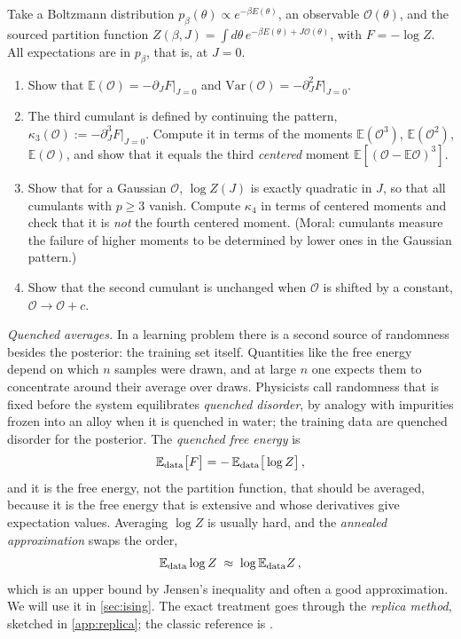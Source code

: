 \documentclass[11pt]{article}
\newcommand{\E}{\mathbb{E}}
\newcommand{\CO}{{\mathcal O}}
\newcommand{\pd}{\partial}
\begin{document}
\begin{exercise}
\label{ex:cumulants}
\important
Take a Boltzmann distribution $p_\beta(\theta)\propto e^{-\beta E(\theta)}$, an observable $\CO(\theta)$, and the sourced partition function $Z(\beta,J) = \int d\theta\, e^{-\beta E(\theta)+J\CO(\theta)}$, with $F = -\log Z$. All expectations are in $p_\beta$, that is, at $J=0$.
\begin{enumerate}
  \item Show that $\E(\CO) = -\pd_JF|_{J=0}$ and $\mathrm{Var}(\CO) = -\pd_J^2F|_{J=0}$.
  \item The third cumulant is defined by continuing the pattern, $\kappa_3(\CO) := -\pd_J^3F|_{J=0}$. Compute it in terms of the moments $\E(\CO^3)$, $\E(\CO^2)$, $\E(\CO)$, and show that it equals the third \emph{centered} moment $\E[(\CO-\E\CO)^3]$.
  \item Show that for a Gaussian $\CO$, $\log Z(J)$ is exactly quadratic in $J$, so that all cumulants with $p\geq 3$ vanish. Compute $\kappa_4$ in terms of centered moments and check that it is \emph{not} the fourth centered moment. (Moral: cumulants measure the failure of higher moments to be determined by lower ones in the Gaussian pattern.)
  \item Show that the second cumulant is unchanged when $\CO$ is shifted by a constant, $\CO \to \CO + c$.
\end{enumerate}
\end{exercise}

\emph{Quenched averages.} In a learning problem there is a second source of randomness besides the posterior: the training set itself. Quantities like the free energy depend on which $n$ samples were drawn, and at large $n$ one expects them to concentrate around their average over draws. Physicists call randomness that is fixed before the system equilibrates \emph{quenched disorder}, by analogy with impurities frozen into an alloy when it is quenched in water; the training data are quenched disorder for the posterior. The \emph{quenched free energy} is
%
\begin{equation}
    \E_{\rm data}\big[F\big] = -\,\E_{\rm data}\big[\log Z\big]\,, \label{quenched-F}
\end{equation}
%
and it is the free energy, not the partition function, that should be averaged, because it is the free energy that is extensive and whose derivatives give expectation values. Averaging $\log Z$ is usually hard, and the \emph{annealed approximation} swaps the order,
%
\begin{equation}
    \E_{\rm data}\log Z \;\approx\; \log\E_{\rm data}Z\,, \label{annealed-swap}
\end{equation}
%
which is an upper bound by Jensen's inequality and often a good approximation. We will use it in \cref{sec:ising}. The exact treatment goes through the \emph{replica method}, sketched in \cref{app:replica}; the classic reference is \cite{engel2001statistical}.
\end{document}
